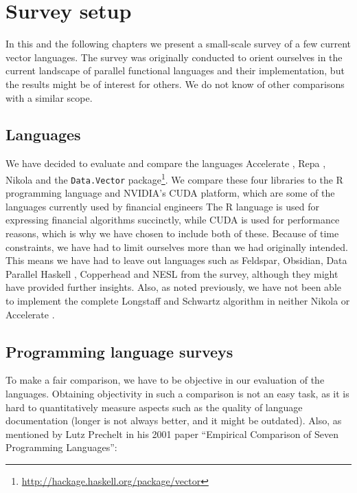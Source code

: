 \chapter{Survey setup}
In this and the following chapters we present a small-scale survey of
a few current vector languages. The survey was originally conducted to
orient ourselves in the current landscape of parallel functional
languages and their implementation, but the results might be of
interest for others. We do not know of other comparisons with a
similar scope.

\section{Languages}
We have decided to evaluate and compare the languages Accelerate
\cite{chakravarty2011accelerating}, Repa \cite{keller2010regular},
Nikola \cite{mainland2010nikola} and the \texttt{Data.Vector}
package\footnote{\url{http://hackage.haskell.org/package/vector}}. We
compare these four libraries to the R programming language and
NVIDIA's CUDA platform, which are some of the languages currently used
by financial engineers
The R language is used for expressing financial algorithms
succinctly, while CUDA is used for performance reasons, which is why
we have chosen to include both of these. Because of time constraints,
we have had to limit ourselves more than we had originally
intended. This means we have had to leave out languages such as
Feldspar\cite{axelsson2010feldspar},
Obsidian\cite{svensson2011obsidian}, Data Parallel Haskell \cite{keller2010regular},
Copperhead\cite{Catanzaro2011} and NESL\cite{nesl} from the survey,
although they might have provided further insights. Also, as noted
previously, we have not been able to implement the complete Longstaff
and Schwartz algorithm in neither Nikola or Accelerate
.


\section{Programming language surveys}
To make a fair comparison, we have to be objective in our evaluation
of the languages. Obtaining objectivity in such a comparison is not
an easy task, as it is hard to quantitatively measure aspects such as
the quality of language documentation (longer is not always better,
and it might be outdated). Also, as mentioned by Lutz Prechelt in his
2001 paper ``Empirical Comparison of Seven Programming Languages'':

